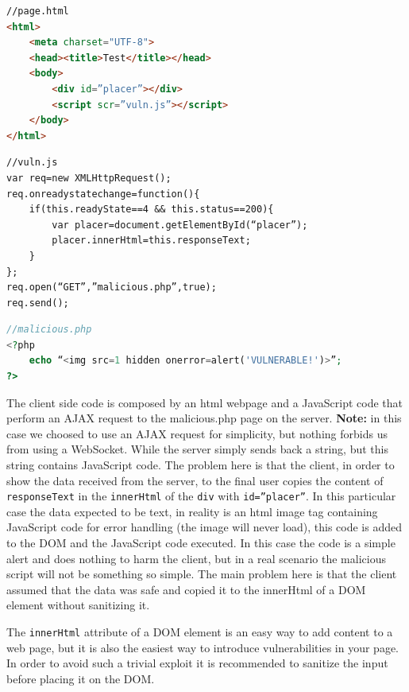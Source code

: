 \begin{lstlisting}[language=html]
//page.html
<html>
	<meta charset="UTF-8">
	<head><title>Test</title></head>
	<body>
		<div id=”placer”></div>
		<script scr=”vuln.js”></script>
	</body>
</html>
\end{lstlisting}

\begin{lstlisting}
//vuln.js
var req=new XMLHttpRequest();
req.onreadystatechange=function(){
	if(this.readyState==4 && this.status==200){
		var placer=document.getElementById(“placer”);
		placer.innerHtml=this.responseText;
	}
};
req.open(“GET”,”malicious.php”,true);
req.send();
\end{lstlisting}

\begin{lstlisting}[language=php]
//malicious.php
<?php
	echo “<img src=1 hidden onerror=alert('VULNERABLE!')>”;
?>
\end{lstlisting}

The client side code is composed by an html webpage and a JavaScript code that perform an AJAX request to the malicious.php page on the server.\newline
\textbf{Note:} in this case we choosed to use an AJAX request for simplicity, but nothing forbids us from using a WebSocket.\newline
While the server simply sends back a string, but this string contains JavaScript code.\newline
The problem here is that the client, in order to show the data received from the server, to the final user copies the content of \texttt{responseText} in the \texttt{innerHtml} of the \texttt{div} with \texttt{id=”placer”}.
In this particular case the data expected to be text, in reality is an html image tag containing JavaScript code for error handling (the image will never load), this code is added to the DOM and the JavaScript code executed.\newline
In this case the code is a simple alert and does nothing to harm the client, but in a real scenario the malicious script will not be something so simple.\newline
The main problem here is that the client assumed that the data was safe and copied it to the innerHtml of a DOM element without sanitizing it.\newline

The \texttt{innerHtml} attribute of a DOM element is an easy way to add content to a web page, but it is also the easiest way to introduce vulnerabilities in your page.
In order to avoid such a trivial exploit it is recommended to sanitize the input before placing it on the DOM.\newline

